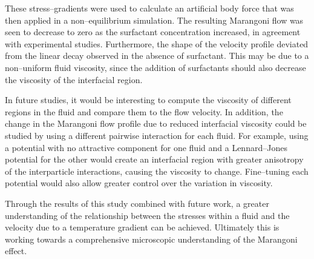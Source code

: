 These stress--gradients were used to calculate an artificial body force that was then applied in a non--equilibrium simulation.
The resulting Marangoni flow was seen to decrease to zero as the surfactant concentration increased, in agreement with experimental studies.
Furthermore, the shape of the velocity profile deviated from the linear decay observed in the absence of surfactant.
This may be due to a non--uniform fluid viscosity, since the addition of surfactants should also decrease the viscosity of the interfacial region.

In future studies, it would be interesting to compute the viscosity of different regions in the fluid and compare them to the flow velocity.
In addition, the change in the Marangoni flow profile due to reduced interfacial viscosity could be studied by using a different pairwise interaction for each fluid.
For example, using a potential with no attractive component for one fluid and a Lennard--Jones potential for the other would create an interfacial region with greater anisotropy of the interparticle interactions, causing the viscosity to change.
Fine--tuning each potential would also allow greater control over the variation in viscosity.

Through the results of this study combined with future work, a greater understanding of the relationship between the stresses within a fluid and the velocity due to a temperature gradient can be achieved. 
Ultimately this is working towards a comprehensive microscopic understanding of the Marangoni effect.
